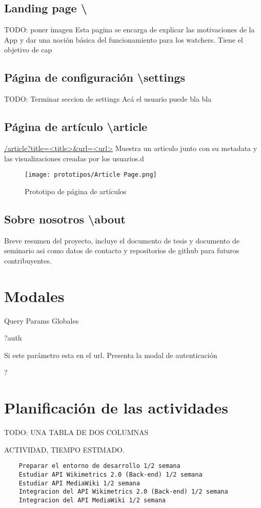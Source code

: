 \subsection{Landing page \textbackslash}
TODO: poner imagen
Esta pagina se encarga de explicar las motivaciones de la App y dar una noción básica del funcionamiento para los watchers.
Tiene el objetivo de cap

\subsection{Página de configuración \textbackslash settings}
TODO: Terminar seccion de settings
Acá el usuario puede bla bla

\subsection{Página de artículo \textbackslash article}
\url{/article?title=<title>&url=<url>}
Muestra un articulo junto con su metadata y las visualizaciones creadas por los usuarios.d

\begin{figure}[]
    \centering
    \texttt{[image: prototipos/Article Page.png]}
    \caption{Prototipo de página de artículos}
    \label{PrototipoSettingsPage}
\end{figure}

\subsection{Sobre nosotros \textbackslash about}
Breve resumen del proyecto, incluye el documento de tesis y documento de seminario asi como datos de contacto y repositorios de github para futuros contribuyentes.

\section{Modales}

Query Params Globales

?auth

Si este parámetro esta en el url. Presenta la modal de autenticación

?

\section{Planificación de las actividades}

TODO: UNA TABLA DE DOS COLUMNAS

ACTIVIDAD, TIEMPO ESTIMADO.

\begin{lstlisting}
    Preparar el entorno de desarrollo 1/2 semana
    Estudiar API Wikimetrics 2.0 (Back-end) 1/2 semana
    Estudiar API MediaWiki 1/2 semana
    Integracion del API Wikimetrics 2.0 (Back-end) 1/2 semana
    Integracion del API MediaWiki 1/2 semana
\end{lstlisting}